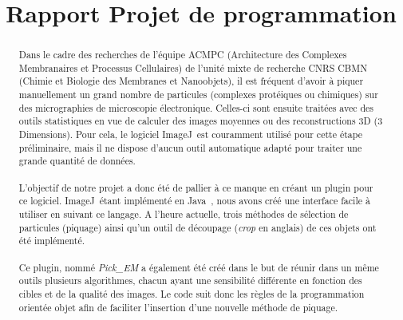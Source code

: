 \documentclass[12pt,a4paper]{report}
\title{Rapport Projet de programmation}
\begin{document}

\newcommand{\cme}{cryo-MET}
\newcommand{\me}{MET}
\newcommand{\java}{Java~{\tiny \texttrademark}}
\newcommand{\js}{JavaScript}
\newcommand{\imj}{ImageJ}

\begin{abstract}
\paragraph*{}
Dans le cadre des recherches de l'équipe ACMPC (Architecture des Complexes Membranaires et Processus Cellulaires) de l'unité mixte de recherche CNRS CBMN (Chimie et Biologie des Membranes et Nanoobjets), il est fréquent d'avoir à piquer manuellement un grand nombre de particules (complexes protéiques ou chimiques) sur des micrographies de microscopie électronique. Celles-ci sont ensuite traitées avec des outils statistiques en vue de calculer des images moyennes ou des reconstructions 3D (3 Dimensions). Pour cela, le logiciel \imj ~est couramment utilisé pour cette étape préliminaire, mais il ne dispose d'aucun outil automatique adapté pour traiter une grande quantité de données.
\paragraph*{}
L'objectif de notre projet a donc été de pallier à ce manque en créant un plugin pour ce logiciel. \imj ~étant implémenté en \java , nous avons créé une interface facile à utiliser en suivant ce langage. A l'heure actuelle, trois méthodes de sélection de particules (piquage) ainsi qu'un outil de découpage (\textit{crop} en anglais) de ces objets ont été implémenté.
\paragraph*{}
Ce plugin, nommé \emph{Pick\_EM} a également été créé dans le but de réunir dans un même outils plusieurs algorithmes, chacun ayant une sensibilité différente en fonction des cibles et de la qualité des images. Le code suit donc les règles de la programmation orientée objet afin de faciliter l'insertion d'une nouvelle méthode de piquage.



\end{abstract}
\end{document}
